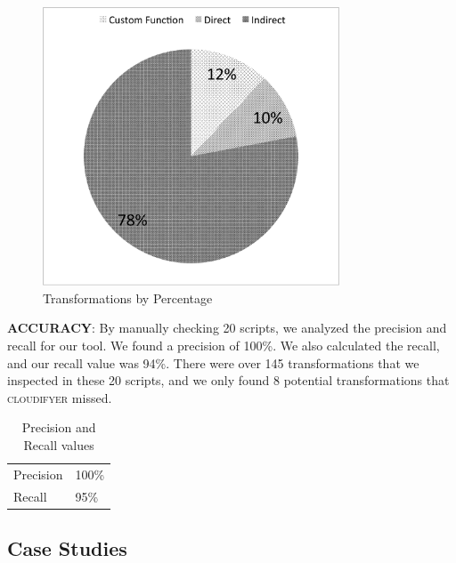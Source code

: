 \documentclass{sigplanconf}
\begin{document}
\begin{figure}[htbp!]
\begin{center}
\includegraphics[width=250pt]{images/TransformationsChart}
\nocaptionrule
\caption{Transformations by Percentage}
\label{fig:transformations_pieChart}
\end{center}
\end{figure}

\textbf{ACCURACY}: By manually checking 20 scripts, we analyzed the precision and recall for our tool.  We found a precision of 100\%.  We also calculated the recall, and our recall value was 94\%. There were over 145 transformations that we inspected in these 20 scripts, and we only found 8 potential transformations that \textsc{cloudifyer} missed.

\begin{table}[htdp]
\begin{center}
\begin{tabular}{ll}

Precision & 100\% \\
Recall & 95\% \\
\end{tabular}
\nocaptionrule
\caption{Precision and Recall values}
\end{center}
\label{table:precAndRecall}
\end{table}%

\subsection{Case Studies}
\end{document}
